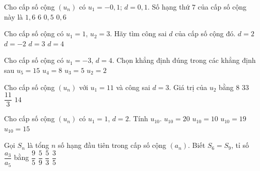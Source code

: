 \begin{ex}%
	Cho cấp số cộng $\left(u_n \right)$ có $u_1=-0{,}1$; $d=0{,}1$. Số hạng  thứ $7$ của cấp số cộng này là
	 \choice
		 {$1{,}6$}
		 {$6$}
		 {\True $0{,}5$}
		 {$0{,}6$}
	 \loigiai{
		\[u_7=-0{,}1+6\cdot0{,}1=0{,}5.\] 
	 }
\end{ex}

\begin{ex}%
	Cho cấp  số cộng có $u_1=1$, $u_2=3$. Hãy tìm công sai $d$ của cấp số cộng đó.
	\choice 
		{\True  $d=2$}
		{$d=-2$} 
		 {$d=3$}
		{$d=4$} 
\end{ex}

\begin{ex}%
	 Cho cấp số cộng có $u_1=-3$, $d=4$. Chọn khẳng định đúng trong các khẳng định sau
	 \choice
		 {$u_5=15$}
		{$u_4=8$} 
		{\True $u_3=5$} 
		{$u_2=2$} 
\end{ex}

\begin{ex}%
	Cho cấp số cộng $(u_n)$ với $u_1=11$ và  công sai $d=3$. Giá trị của $u_2$ bằng
	\choice 
		 {$8$}
		{$33$} 
		{$\dfrac{11}{3}$} 
		 {\True $14$}
\end{ex}

\begin{ex}%
	Cho cấp số  cộng $(u_n)$ có $u_1=1$, $d=2$. Tính $u_{10}$.
	\choice 
		{$u_{10}=20$} 
		{$u_{10}=10$} 
		 {\True $u_{10}=19$}
		 {$u_{10}=15$}
\end{ex}

\begin{ex}%
	Gọi $S_n$ là tổng $n$ số hạng đầu tiên trong cấp số cộng $(a_n)$. Biết  $S_6=S_9$, tỉ số $\dfrac {a_3}{a_5}$ bằng
	 \choice
		{$\dfrac {9}{5}$} 
		{$\dfrac  {5}{9}$}
		 {\True $\dfrac {5}{3}$}
		{$\dfrac {3}{5}$} 
\end{ex}

